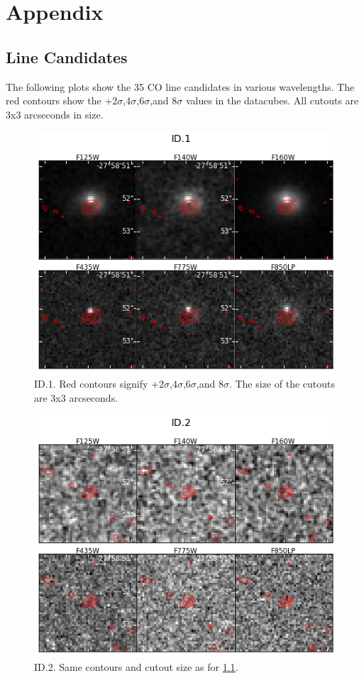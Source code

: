 \chapter{Appendix}

\section{Line Candidates}\label{sec:A1}

The following plots show the 35 CO line candidates in various wavelengths. The red contours show the +2$\sigma$,4$\sigma$,6$\sigma$,and 8$\sigma$ values in the datacubes. All cutouts are 3x3 arcseconds in size.

\begin{figure}[tbp]
\centering \includegraphics[width=160mm]{Matched/ASPECS_Cutout_0.jpg}
\caption{ID.1. Red contours signify +2$\sigma$,4$\sigma$,6$\sigma$,and 8$\sigma$. The size of the cutouts are 3x3 arcseconds.}
\label{fig:Match_One}
\end{figure}

\begin{figure}[tbp]
\centering \includegraphics[width=160mm]{Matched/ASPECS_Cutout_1.jpg}
\caption{ID.2. Same contours and cutout size as for \ref{fig:Match_One}.}
\label{fig:Match_Two}
\end{figure}


